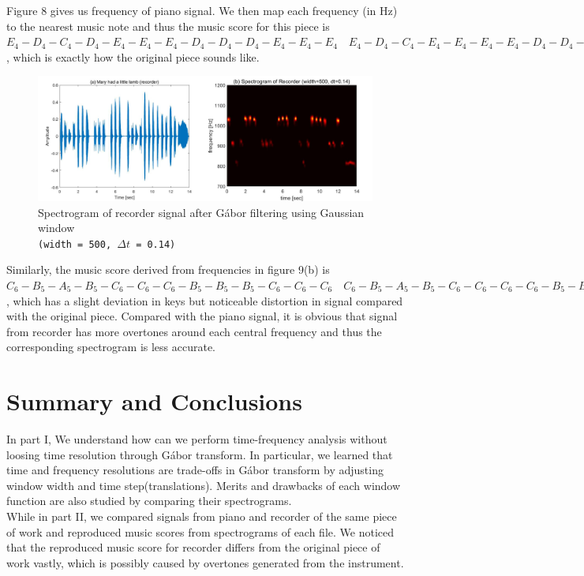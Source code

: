 \documentclass[10pt,a4paper]{article}
\numberwithin{equation}{subsection}
\begin{document}
Figure 8 gives us frequency of piano signal. We then map each frequency (in Hz) to the nearest music note and thus the music score for this piece is $E_4-D_4-C_4-D_4-E_4-E_4-E_4-D_4-D_4-D_4-E_4-E_4-E_4 \quad E_4-D_4-C_4-E_4-E_4-E_4-E_4-D_4-D_4-E_4-D_4-C_4$, which is exactly how the original piece sounds like.
	
\begin{figure}[H]
\begin{center}
\includegraphics[scale=0.22]{f9.jpg}
\caption{Spectrogram of recorder signal after G\'abor filtering using Gaussian window\\ \texttt{(width = 500, $\Delta t$ = 0.14)}}
\end{center}
\end{figure}
	
Similarly, the music score derived from frequencies in figure 9(b) is $C_6-B_5-A_5-B_5-C_6-C_6-C_6-B_5-B_5-B_5-C_6-C_6-C_6 \quad C_6-B_5-A_5-B_5-C_6-C_6-C_6-C_6-B_5-B_5-C_6-B_4-A_5$, which has a slight deviation in keys but noticeable distortion in signal compared with the original piece. Compared with the piano signal, it is obvious that signal from recorder has more overtones around each central frequency and thus the corresponding spectrogram is less accurate.


\section{Summary and Conclusions}
In part I, We understand how can we perform time-frequency analysis without loosing time resolution through G\'abor transform. In particular, we learned that time and frequency resolutions are trade-offs in G\'abor transform by adjusting window width and time step(translations). Merits and drawbacks of each window function are also studied by comparing their spectrograms.\\
While in part II, we compared signals from piano and recorder of the same piece of work and reproduced music scores from spectrograms of each file. We noticed that the reproduced music score for recorder differs from the original piece of work vastly, which is possibly caused by overtones generated from the instrument.
\end{document}
